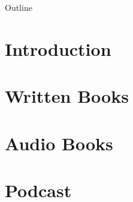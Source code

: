 \documentclass[
    NAME={Dr. Helga Ingimundardóttir},
    EMAIL={helgaingim@hi.is},
    FACULTY={Industrial Engineering},
    TITLE={Pushing Boundaries: A Data-Driven Dive into `Legend of the Ice People'},
    SUBTITLE={Unravel the unexpected synergy of literature and data science},
    SEMINAR={Haustráðstefna Advania},
    DATE={September 8, 2023}
    ]{hi-latex/hi-beamer}
\begin{document}
\begin{frame}{Outline}
  \tableofcontents
\end{frame}

\section{Introduction}


\section{Written Books}


\section{Audio Books}


\section{Podcast}

\end{document}
